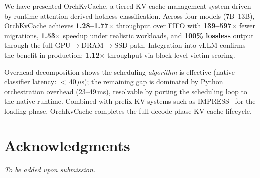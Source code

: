 \documentclass[conference]{IEEEtran}
\begin{document}
We have presented OrchKvCache, a tiered KV-cache management system driven by runtime attention-derived hotness classification. Across four models (7B--13B), OrchKvCache achieves \textbf{1.28--1.77$\times$} throughput over FIFO with \textbf{139--597$\times$} fewer migrations, \textbf{1.53$\times$} speedup under realistic workloads, and \textbf{100\% lossless} output through the full GPU$\to$DRAM$\to$SSD path. Integration into vLLM confirms the benefit in production: \textbf{1.12$\times$} throughput via block-level victim scoring.

Overhead decomposition shows the scheduling \emph{algorithm} is effective (native classifier latency: $<$\,40\,$\mu$s); the remaining gap is dominated by Python orchestration overhead (23--49\,ms), resolvable by porting the scheduling loop to the native runtime. Combined with prefix-KV systems such as IMPRESS~\cite{impress} for the loading phase, OrchKvCache completes the full decode-phase KV-cache lifecycle.

\section*{Acknowledgments}
\textit{To be added upon submission.}
\end{document}

